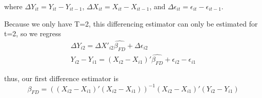 \documentclass[letterpaper, 12pt]{article}
\begin{document}
where $\Delta Y_{it} = Y_{it} - Y_{it-1}$, $\Delta X_{it} = X_{it} - X_{it-1}$, and $\Delta \epsilon_{it} = \epsilon_{it} - \epsilon_{it-1}$.

Because we only have T=2, this differencing estimator can only be estimated for t=2, so we regress
\begin{align}
\Delta Y_{i2} = \Delta X'_{i2} \widehat{\beta_{FD}} + \Delta \epsilon_{i2} \\
Y_{i2}-Y_{i1} = (X_{i2}-X_{i1})'\widehat{\beta_{FD}} + \epsilon_{i2}-\epsilon_{i1}
\end{align}

thus, our first difference estimator is
\begin{equation}
\widehat{\beta_{FD}}=((X_{i2}-X_{i1})'(X_{i2}-X_{i1}))^{-1} (X_{i2}-X_{i1})'(Y_{i2}-Y_{i1})
\end{equation}
\end{document}
